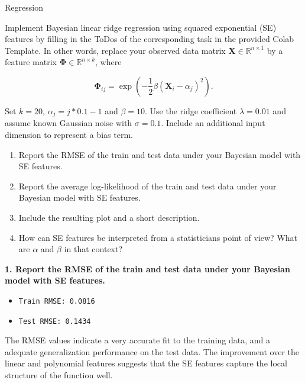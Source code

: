 \documentclass[
	english,
        solution=true
	]{tudaexercise}
\begin{document}
\begin{task}[points=34]{Regression}
    \begin{subtask}[points=8, title=Squared Exponential Features]
        Implement Bayesian linear ridge regression using squared exponential (SE) features by filling in the ToDos of the corresponding task in the provided Colab Template.
        In other words, replace your observed data matrix $\mathbf{X} \in \mathbb{R}^{n \times 1}$ by a feature matrix $\bm{\Phi} \in \mathbb{R}^{n \times k}$, where

        \begin{equation*}
            \bm{\Phi}_{ij} = \exp \left( -\frac{1}{2} \beta (\mathbf{X}_i - \alpha_j)^2 \right).
        \end{equation*}

        Set $k = 20$, $\alpha_j = j * 0.1 - 1$ and $\beta = 10$. Use the ridge coefficient $\lambda = 0.01$ and assume known Gaussian noise with $\sigma = 0.1$.
        Include an additional input dimension to represent a bias term.

        \begin{enumerate}
            \item Report the RMSE of the train and test data under your Bayesian model with SE features. 
            \item Report the average log-likelihood of the train and test data under your Bayesian model with SE features. 
            \item Include the resulting plot and a short description. 
            \item How can SE features be interpreted from a statisticians point of view? What are $\alpha$ and $\beta$ in that context? 
        \end{enumerate}

        \begin{solution}

            \textbf{1. Report the RMSE of the train and test data under your Bayesian model with SE features.}

            \begin{itemize}
                \item \texttt{Train RMSE: 0.0816}
                \item \texttt{Test RMSE: 0.1434}
            \end{itemize}

            The RMSE values indicate a very accurate fit to the training data, and a adequate generalization performance on the test data.
            The improvement over the linear and polynomial features suggests that the SE features capture the local structure of the function well.


\end{solution}
\end{subtask}
\end{task}
\end{document}
